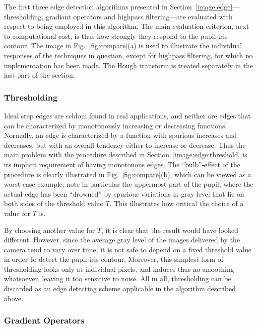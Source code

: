 The first three edge detection algorithms presented in
Section~\ref{image:edge}---thresholding, gradiant operators and
highpass filtering---are evaluated with respect to being employed in
this algorithm.  The main evaluation criterion, next to computational
cost, is thus how strongly they respond to the pupil-iris contour. The
image in Fig.~\ref{fig:compare}(a) is used to illustrate the individual
responses of the techniques in question, except for highpass
filtering, for which no implementation has been made.  The Hough
transform is treated separately in the last part of the section.

\subsubsection{Thresholding}

Ideal step edges are seldom found in real applications, and neither
are edges that can be characterized by monotonously increasing or
decreasing functions.  Normally, an edge is characterized by a
function with spurious increases and decreases, but with an overall
tendency either to increase or decrease.  Thus the main problem with
the procedure described in Section~\ref{image:edge:threshold} is its
implicit requirement of having monotonous edges.  The ``bulb''-effect
of the procedure is clearly illustrated in Fig.~\ref{fig:compare}(b),
which can be viewed as a worst-case example; note in particular the
uppermost part of the pupil, where the actual edge has been
``drowned'' by spurious variations in gray level that lie on both
sides of the threshold value $T$.  This illustrates how critical the
choice of a value for $T$ is.

By choosing another value for $T$, it is clear that the result would
have looked different.  However, since the average gray level of the
images delivered by the camera tend to vary over time, it is not safe
to depend on a fixed threshold value in order to detect the pupil-iris
contour.  Moreover, this simplest form of thresholding looks only at
individual pixels, and induces thus no smoothing whatsoever, leaving
it too sensitive to noise.  All in all, thresholding can be discarded
as an edge detecting scheme applicable in the algorithm described
above.

\subsubsection{Gradient Operators}

